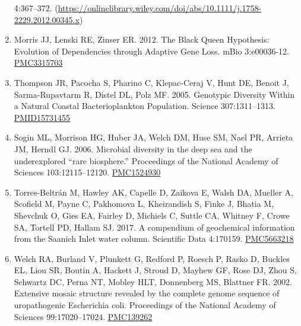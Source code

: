 \documentclass[]{article}
\begin{document}
\begin{enumerate}
  4:367--372.
  (\url{https://onlinelibrary.wiley.com/doi/abs/10.1111/j.1758-2229.2012.00345.x})
\item
  Morris JJ, Lenski RE, Zinser ER. 2012. The Black Queen Hypothesis:
  Evolution of Dependencies through Adaptive Gene Loss. mBio
  3:e00036-12.
  \href{https://www.ncbi.nlm.nih.gov/pmc/articles/PMC3315703/}{PMC3315703}
\item
  Thompson JR, Pacocha S, Pharino C, Klepac-Ceraj V, Hunt DE, Benoit J,
  Sarma-Rupavtarm R, Distel DL, Polz MF. 2005. Genotypic Diversity
  Within a Natural Coastal Bacterioplankton Population. Science
  307:1311--1313.
  \href{https://www.ncbi.nlm.nih.gov/pubmed/15731455}{PMID15731455}
\item
  Sogin ML, Morrison HG, Huber JA, Welch DM, Huse SM, Nael PR, Arrieta
  JM, Herndl GJ. 2006. Microbial diversity in the deep sea and the
  underexplored ``rare biosphere.'' Proceedings of the National Academy
  of Sciences 103:12115--12120.
  \href{https://www.ncbi.nlm.nih.gov/pubmed/16880384}{PMC1524930}
\item
  Torres-Beltrán M, Hawley AK, Capelle D, Zaikova E, Walsh DA, Mueller
  A, Scofield M, Payne C, Pakhomova L, Kheirandish S, Finke J, Bhatia M,
  Shevchuk O, Gies EA, Fairley D, Michiels C, Suttle CA, Whitney F,
  Crowe SA, Tortell PD, Hallam SJ. 2017. A compendium of geochemical
  information from the Saanich Inlet water column. Scientific Data
  4:170159.
  \href{https://www.ncbi.nlm.nih.gov/pubmed/29087371}{PMC5663218}
\item
  Welch RA, Burland V, Plunkett G, Redford P, Roesch P, Rasko D, Buckles
  EL, Liou SR, Boutin A, Hackett J, Stroud D, Mayhew GF, Rose DJ, Zhou
  S, Schwartz DC, Perna NT, Mobley HLT, Donnenberg MS, Blattner FR.
  2002. Extensive mosaic structure revealed by the complete genome
  sequence of uropathogenic Escherichia coli. Proceedings of the
  National Academy of Sciences 99:17020--17024.
  \href{https://www.ncbi.nlm.nih.gov/pubmed/12471157}{PMC139262}
\end{enumerate}
\end{document}
